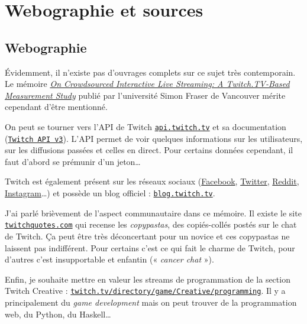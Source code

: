 \documentclass[a4paper]{article}
\begin{document}
\newpage 
\section{Webographie et sources}
\subsection{Webographie}
\renewcommand{\refname}{}
Évidemment, il n'existe pas d'ouvrages complets sur ce sujet très contemporain. Le mémoire \href{https://arxiv.org/pdf/1502.04666.pdf}{\textit{On Crowdsourced Interactive Live Streaming: A
Twitch.TV-Based Measurement Study}} publié par l'université Simon Fraser de Vancouver mérite cependant d'être mentionné.

On peut se tourner vers l'API de Twitch \href{https://api.twitch.tv/}{\texttt{api.twitch.tv}} et sa documentation (\href{https://github.com/justintv/twitch-api}{\texttt{Twitch API v3}}). L'API permet de voir quelques informations sur les utilisateurs, sur les diffusions passées et celles en direct. Pour certains données cependant, il faut d'abord se prémunir d'un jeton\ldots

Twitch est également présent sur les réseaux sociaux (\href{https://www.facebook.com/Twitch/}{Facebook}, \href{https://twitter.com/twitch}{Twitter}, \href{https://www.reddit.com/r/twitch}{Reddit}, \href{https://www.instagram.com/twitch/}{Instagram}\ldots) et possède un blog officiel : \href{https://blog.twitch.tv}{\texttt{blog.twitch.tv}}.

J'ai parlé brièvement de l'aspect communautaire dans ce mémoire. Il existe le site \href{http://www.twitchquotes.com}{\texttt{twitchquotes.com}} qui recense les \textit{copypastas}, des copiés-collés postés sur le chat de Twitch. Ça peut être très déconcertant pour un novice et ces copypastas ne laissent pas indifférent. Pour certains c'est ce qui fait le charme de Twitch, pour d'autres c'est insupportable et enfantin (« \textit{cancer chat} »). 

Enfin, je souhaite mettre en valeur les streams de programmation de la section Twitch Creative : \href{https://www.twitch.tv/directory/game/Creative/programming}{\texttt{twitch.tv/directory/game/Creative/programming}}. Il y a principalement du \textit{game development} mais on peut trouver de la programmation web, du Python, du Haskell\ldots
\end{document}
